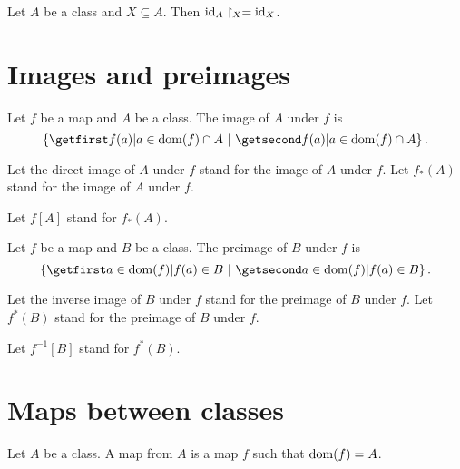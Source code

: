 \documentclass[../set-theory.tex]{subfiles}
\begin{document}
  \begin{forthel}
    \begin{proposition}\label{SET_THEORY_06_2170189258948608}
      Let $A$ be a class and $X \subseteq A$.
      Then $\operatorname{id}_{A} \restriction_{X} = \operatorname{id}_{X}$.
    \end{proposition}
  \end{forthel}


  \section{Images and preimages}

  \begin{forthel}
    \begin{definition}\label{SET_THEORY_06_3038237683613696}
      Let $f$ be a map and $A$ be a class.
      The image of $A$ under $f$ is
      \[ \class{ f(a) | a \in \dom(f) \cap A }. \]
    \end{definition}

    Let the direct image of $A$ under $f$ stand for the image of $A$ under $f$.
    Let $f_{*}(A)$ stand for the image of $A$ under $f$.

    Let $f[A]$ stand for $f_{*}(A)$.
  \end{forthel}

  \begin{forthel}
    \begin{definition}\label{SET_THEORY_06_4563167805964288}
      Let $f$ be a map and $B$ be a class.
      The preimage of $B$ under $f$ is
      \[ \class{ a \in \dom(f) | f(a) \in B }. \]
    \end{definition}

    Let the inverse image of $B$ under $f$ stand for the preimage of $B$ under
    $f$.
    Let $f^{*}(B)$ stand for the preimage of $B$ under $f$.

    Let $f^{-1}[B]$ stand for $f^{*}(B)$.
  \end{forthel}


  \section{Maps between classes}

  \begin{forthel}
    \begin{definition}\label{SET_THEORY_06_6934038600220672}
      Let $A$ be a class.
      A map from $A$ is a map $f$ such that $\operatorname{dom}(f) = A$.
    \end{definition}
  \end{forthel}
\end{document}
